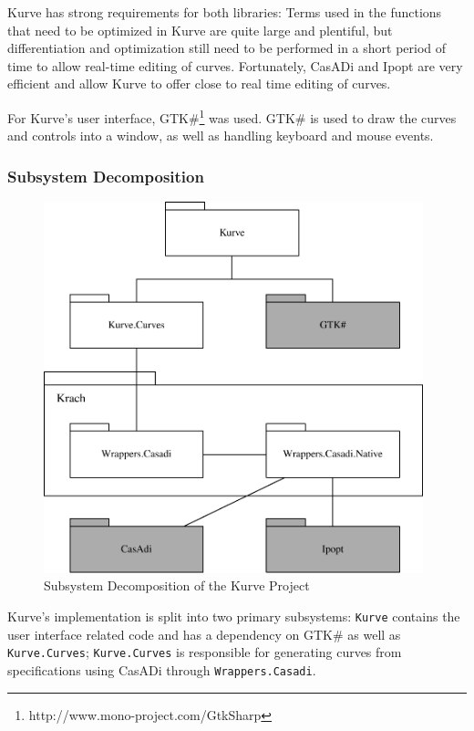 \documentclass[a4paper]{article}
\begin{document}
				 Kurve has strong requirements for both libraries: Terms used in the functions that need to be optimized in Kurve are quite large and plentiful, but differentiation and optimization still need to be performed in a short period of time to allow real-time editing of curves. Fortunately, CasADi and Ipopt are very efficient and allow Kurve to offer close to real time editing of curves.

				For Kurve's user interface, GTK\#\footnote{http://www.mono-project.com/GtkSharp} was used. GTK\# is used to draw the curves and controls into a window, as well as handling keyboard and mouse events.
				
			\subsubsection{Subsystem Decomposition}	
			
				\begin{figure}[htb]
					\centering
					\includegraphics[width=110mm]{content/output/subsystems.pdf}
					\caption{Subsystem Decomposition of the Kurve Project}
					\label{figure:subsystem_decomposition}
				\end{figure}
				
				Kurve's implementation is split into two primary subsystems: \verb|Kurve| contains the user interface related code and has a dependency on GTK\# as well as \verb|Kurve.Curves|; \verb|Kurve.Curves| is responsible for generating curves from specifications using CasADi through \verb|Wrappers.Casadi|. 
				
\end{document}
